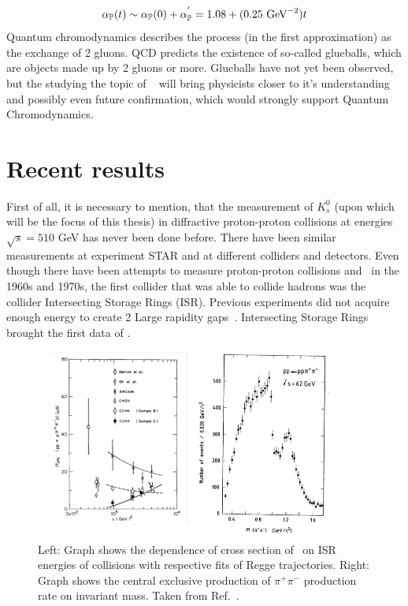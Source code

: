 \begin{equation}
    \centering
    \alpha_{\mathbb{P}}(t) \sim \alpha_{\mathbb{P}}(0) + \alpha_{\mathbb{P}}^{'} = 1.08 + (0.25~\mathrm{GeV}^{-2})t
    \label{t32}
\end{equation}
Quantum chromodynamics describes the process (in the first approximation) as the exchange of 2 gluons. QCD predicts the existence of so-called glueballs, which are objects made up by 2 gluons or more. Glueballs have not yet been observed, but the studying the topic of \DPE~ will bring physicists closer to it's understanding and possibly even future confirmation, which would strongly support Quantum Chromodynamics. 

\section{Recent results}
\label{recent}
First of all, it is necessary to mention, that the measurement of $K^{0}_s$ (upon which will be the focus of this thesis) in diffractive proton-proton collisions at energies $\sqrt{s}=510$ GeV has never been done before. There have been similar measurements at experiment STAR and at different colliders and detectors. Even though there have been attempts to measure proton-proton collisions and \DPE~in the 1960s and 1970s, the first collider that was able to collide hadrons was the collider Intersecting Storage Rings (ISR). Previous experiments did not acquire enough energy to create 2 Large rapidity gaps~\cite{Albrow_2017}. Intersecting Storage Rings brought the first data of \DPE.
\FloatBarrier
\begin{figure}[ht]
    \centering
    \includegraphics[width=0.9\textwidth]{figures/ISR.jpg}
    \caption[Cross section of pp collisions from ISR]{Left: Graph shows the dependence of cross section of \DPE~on ISR energies of collisions with respective fits of Regge trajectories. Right: Graph shows the central exclusive production of $\pi^{+}\pi^{-}$ production rate on invariant mass. Taken from Ref.~\cite{Albrow_2017}.}
    \label{tf6}
\end{figure}

